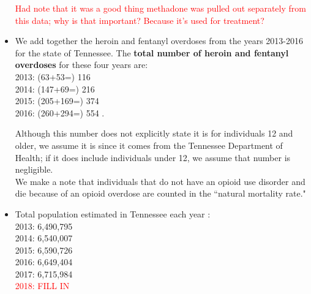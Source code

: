 \documentclass[12pt]{article}
\begin{document}
\begin{itemize}
\textcolor{red}{Had note that it was a good thing methadone was pulled out separately from this data; why is that important? Because it's used for treatment?} \\

\item We add together the heroin and fentanyl overdoses from the years 2013-2016 for the state of Tennessee. The \textbf{total number of heroin and fentanyl overdoses} for these four years are: \\
2013: (63+53=) 116 \\
2014: (147+69=) 216 \\
2015: (205+169=) 374 \\
2016: (260+294=) 554 \cite{PDO}. 

Although this number does not explicitly state it is for individuals 12 and older, we assume it is since it comes from the Tennessee Department of Health; if it does include individuals under 12, we assume that number is negligible. \\

We make a note that individuals that do not have an opioid use disorder and die because of an opioid overdose are counted in the ``natural mortality rate." 




\item Total population estimated in Tennessee each year \cite{USCensus}: \\
2013: 6,490,795 \\
2014: 6,540,007 \\
2015: 6,590,726 \\
2016: 6,649,404 \\
2017: 6,715,984 \\
\textcolor{red}{2018: FILL IN} \\


\end{itemize}
\end{document}
